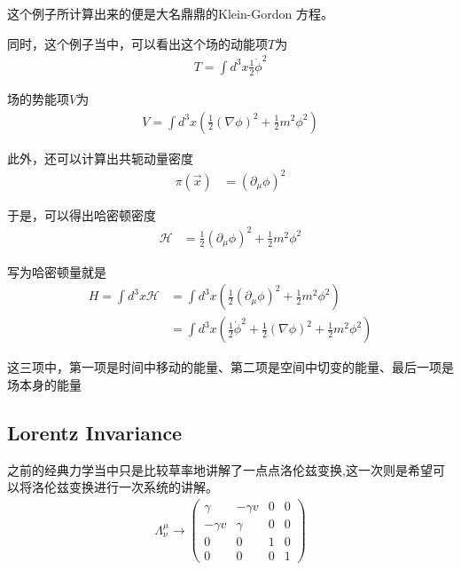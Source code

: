 \documentclass{article}
\begin{document}
这个例子所计算出来的便是大名鼎鼎的Klein-Gordon 方程。

同时，这个例子当中，可以看出这个场的动能项$T$为
\begin{align*}
    T=\int d^3x\frac{1}{2}\dot{\phi}^2
\end{align*}

场的势能项$V$为
\begin{align*}
    V=\int d^3x \left(\frac{1}{2}(\nabla\phi)^2+\frac{1}{2}m^2\phi^2\right)
\end{align*}

此外，还可以计算出共轭动量密度
\begin{align*}
    \pi(\vec{x})&=\left(\partial_\mu\phi\right)^2
\end{align*}

于是，可以得出哈密顿密度
\begin{align*}
    \mathcal{H}&=\frac{1}{2}\left(\partial_\mu\phi\right)^2+\frac{1}{2}m^2\phi^2
\end{align*}

写为哈密顿量就是
\begin{align*}
    H=\int d^3x \mathcal{H}&=\int d^3x \left(\frac{1}{2}\left(\partial_\mu\phi\right)^2+\frac{1}{2}m^2\phi^2\right)\\
    &=\int d^3x \left(\frac{1}{2}\dot{\phi}^2+\frac{1}{2}\left(\nabla\phi\right)^2+\frac{1}{2}m^2\phi^2\right)
\end{align*}

这三项中，第一项是时间中移动的能量、第二项是空间中切变的能量、最后一项是场本身的能量





















\subsection{Lorentz Invariance}

之前的经典力学当中只是比较草率地讲解了一点点洛伦兹变换,这一次则是希望可以将洛伦兹变换进行一次系统的讲解。
\begin{align*}
    \varLambda_\nu^\mu\to
    \begin{pmatrix}
        \gamma&-\gamma v&0&0\\
        -\gamma v&\gamma&0&0\\
        0&0&1&0\\
        0&0&0&1   
    \end{pmatrix}
\end{align*}
\end{document}

